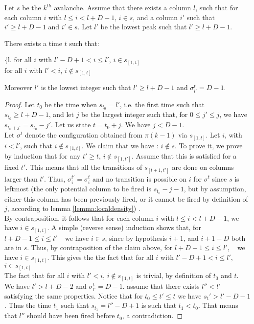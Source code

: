 \documentclass[11pt,a4paper]{llncs}
\begin{document}
\begin{lemma}\label{lemma:D-1}
  Let $s$ be the $k^{th}$ avalanche. Assume that  there exists a column  $l$,  such that for each column  $i$ with $l \leq i < l+D-1$, $i \in s$, and a column $i'$ such that $i'\geq l+D-1$ and $i' \in s$. Let  $l'$ be  the lowest peak such that  $l' \geq l+D-1$.
  
There exists a time $t$  such that:

 \begin{tabular}[t]\{{l}. 
 for all $i$ with $l' -D+1 < i \leq  l'$, $i \in s_{[1,t]}$\\
  for all $i$ with $l'< i$, $i \notin s_{[1,t]}$
   \end{tabular}
   
  Moreover $l'$ is the lowest integer such that  $l' \geq l + D-1$ and $\sigma^t_{l'} = D-1$. 
\end{lemma}

\begin{proof}

 Let $t_0$ be the time when $s_{t_0} = l'$, i.e. the   first  time such that $s_{t_0} \geq l+D-1$,  and let $j$ be the largest integer such that,  for $0 \leq j' \leq j$, we have $s_{t_0 +j'} = s_{t_0} -j'$.  Let us state $t = t_0 +j$. We have $j < D-1$. \\
Let $\sigma^t$ denote the configuration obtained from $\pi(k-1)$ via $s_{[1,t]}$. Let   $i$, with $ i < l'$,  such that $i \notin s_{[1,t]}$. We claim that we have :  $i \notin s$. To prove it, we prove by induction that for any $t' \geq t$,  $i \notin s_{[1,t']}$. Assume that this is satisfied for a fixed $t'$. This means that all the transitions of $s_{[t+1,t']} $  are done on columns larger than $l'$.  Thus, $ \sigma^{t'}_i =   \sigma^{t}_i$ and no transition is possible  on $i$ for $\sigma^{t}$ since  $s$ is leftmost (the only potential column to be fired is $ s_{t_0} -j -1$, but by assumption, either this column has been previously fired,  or it cannot be fired by definition of $j$, according to lemma \ref{lemma:localdensity}) . \\
By contraposition,  it follows that for each column  $i$ with $l \leq i < l+D-1$,  we have $i \in s_{[1,t]}$.  A   simple (reverse sense) induction shows that,   for $ l+D-1 \leq i \leq l'$   we have $i \in s$, since  by hypothesis $i+1$, and $i+1 -D$ both are in $s$.  Thus, by contraposition of the claim above,  for $ l+D-1 \leq i \leq l'$,   we have $i \in s_{[1,t]}$. 
This gives  the the fact that for all $i$ with $l' -D+1 < i \leq  l'$, $i \in s_{[1,t]}$\\
The fact that for all $i$ with $l'< i$, $i \notin s_{[1,t]}$ is trivial,  by definition of $t_0$ and $t$.\\
 We have $l' > l + D-2$ and $\sigma^t_{l'} = D-1$. assume that there exists $l''< l'$ satisfying the same properties. Notice that 
 for $t_0 \leq  t' \leq t$   we have $s_t' > l' - D-1$. Thus the time $t_1$ such that $s_{t_1} = l'' -D+1$  is such that $t_1 < t_0$. 
  That means that $ l'' $  should have been fired before $t_0$,  a contradiction.
\end{proof}
\end{document}
